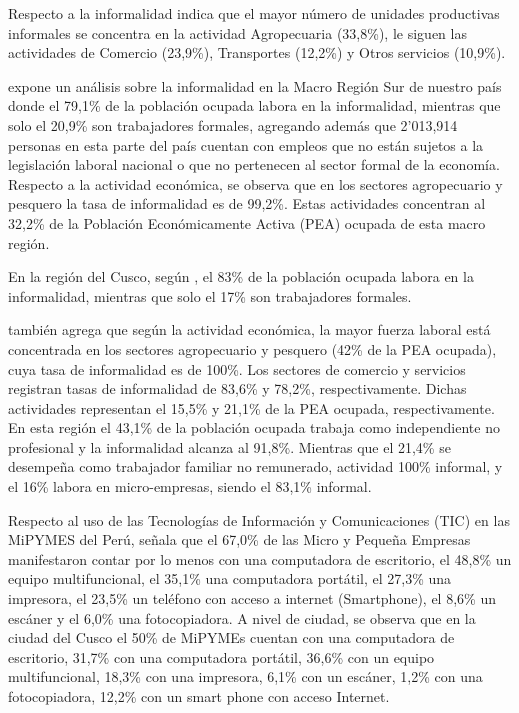 Respecto a la informalidad \cite{inei2} indica que el mayor número de unidades
productivas informales se concentra en la actividad Agropecuaria (33,8\%), le
siguen las actividades de Comercio (23,9\%), Transportes (12,2\%) y Otros servicios (10,9\%).

\cite{perucamaras} expone un análisis sobre la informalidad en la Macro Región
Sur de nuestro país donde el 79,1\% de la población ocupada labora en la informalidad,
mientras que solo el 20,9\% son trabajadores formales, agregando además que
2'013,914 personas en esta parte del país cuentan con empleos que no están sujetos
a la legislación laboral nacional o que no pertenecen al sector formal de la
economía. Respecto a la actividad económica, se observa que en los sectores agropecuario
y pesquero la tasa de informalidad es de 99,2\%. Estas actividades concentran al
32,2\% de la Población Económicamente Activa (PEA) ocupada de esta macro región.

En la región del Cusco, según \cite{perucamaras}, el 83\% de la población
ocupada labora en la informalidad, mientras que solo el 17\% son trabajadores formales.

\cite{perucamaras} también agrega que según la actividad económica, la mayor
fuerza laboral está concentrada en los sectores agropecuario y pesquero (42\% de
la PEA ocupada), cuya tasa de informalidad es de 100\%. Los sectores de comercio
y servicios registran tasas de informalidad de 83,6\% y 78,2\%, respectivamente.
Dichas actividades representan el 15,5\% y 21,1\% de la PEA ocupada, respectivamente.
En esta región el 43,1\% de la población ocupada trabaja como independiente no
profesional y la informalidad alcanza al 91,8\%. Mientras que el 21,4\% se desempeña
como trabajador familiar no remunerado, actividad 100\% informal, y el 16\% labora en
micro-empresas, siendo el 83,1\% informal.

Respecto al uso de las Tecnologías de Información y Comunicaciones (TIC) en las
MiPYMES del Perú, \cite{inei1} señala que el 67,0\% de las Micro y Pequeña Empresas
manifestaron contar por lo menos con una computadora de escritorio, el 48,8\% un
equipo multifuncional, el 35,1\% una computadora portátil, el 27,3\% una impresora,
el 23,5\% un teléfono con acceso a internet (Smartphone), el 8,6\% un escáner y
el 6,0\% una fotocopiadora. A  nivel  de  ciudad,  se  observa  que  en la ciudad
del Cusco el 50\% de MiPYMEs cuentan con una computadora de escritorio, 31,7\% con
una computadora portátil, 36,6\% con un equipo multifuncional, 18,3\% con una impresora,
6,1\% con un escáner, 1,2\% con una fotocopiadora, 12,2\% con un smart phone con acceso
Internet.

